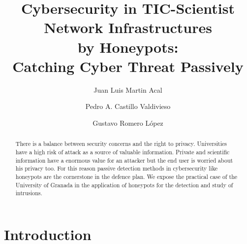 \documentclass[a4paper]{llncs}
\begin{document}
\pagestyle{empty}

\mainmatter

\title{Cybersecurity in TIC-Scientist Network Infrastructures\\by
  Honeypots:\\Catching Cyber Threat Passively}


\author{Juan Luis Martin Acal
\and Pedro A. Castillo Valdivieso
\and Gustavo Romero López} %



\maketitle

\begin{abstract}
There is a balance between security concerns and the right to
privacy. %
  Universities have a high risk of attack as a source of valuable
  information. %
Private and scientific information have a enormous value for an
attacker but the end user is worried about his privacy too. %
 For this reason passive detection methods in cybersecurity like
 honeypots are the cornerstone in the defence plan. We expose the
 practical case of the University of Granada in the application of
 honeypots for the detection and study of intrusions. 
\end{abstract}


\section{Introduction}
\end{document}
